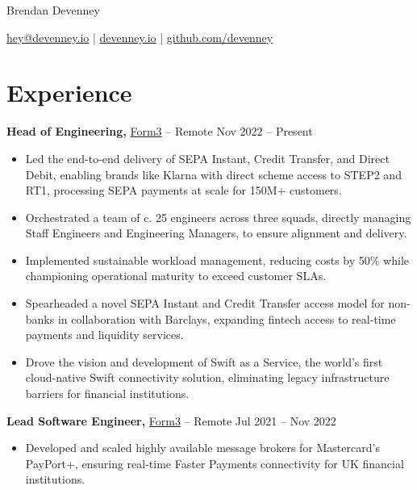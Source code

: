 \documentclass[11pt]{article}       %
\begin{document}
\centerline{\Huge Brendan Devenney}

\vspace{5pt}

\centerline{\href{mailto:hey@devenney.io}{hey@devenney.io} | \href{https://devenney.io}{devenney.io} | \href{https://github.com/devenney}{github.com/devenney}}

\vspace{-10pt}

\section*{Experience}

\textbf{Head of Engineering,} \href{https://form3.tech/}{Form3} -- Remote \hfill Nov 2022 -- Present \\
\vspace{-9pt}
\begin{itemize}
  \item Led the end-to-end delivery of SEPA Instant, Credit Transfer, and Direct Debit, enabling brands like Klarna\cite{klarna} with direct scheme access to STEP2 and RT1, processing SEPA payments at scale for 150M+ customers.
  \item Orchestrated a team of c. 25 engineers across three squads, directly managing Staff Engineers and Engineering Managers, to ensure alignment and delivery.
  \item Implemented sustainable workload management, reducing costs by 50\% while championing operational maturity to exceed customer SLAs.
  \item Spearheaded a novel SEPA Instant and Credit Transfer access model for non-banks in collaboration with Barclays, expanding fintech access to real-time payments and liquidity services.  
  \item Drove the vision and development of Swift as a Service\cite{swift}, the world's first cloud-native Swift connectivity solution, eliminating legacy infrastructure barriers for financial institutions.           
\end{itemize}

\textbf{Lead Software Engineer,} \href{https://form.tech/}{Form3} -- Remote \hfill Jul 2021 -- Nov 2022 \\
\vspace{-9pt}
\begin{itemize}
  \item Developed and scaled highly available message brokers for Mastercard’s PayPort+\cite{payport}, ensuring real-time Faster Payments connectivity for UK financial institutions.
\end{itemize}
\end{document}
